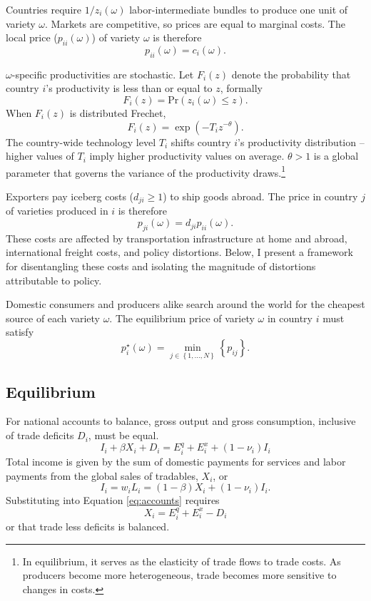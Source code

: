 \documentclass{puthesis}
\begin{document}
Countries require \(1/z_i(\omega)\) labor-intermediate bundles to
produce one unit of variety \(\omega\). Markets are competitive, so
prices are equal to marginal costs. The local price (\(p_{ii}(\omega)\))
of variety \(\omega\) is therefore \begin{equation} \label{eq:pii}
p_{ii}(\omega) = c_i(\omega) .
\end{equation}

\(\omega\)-specific productivities are stochastic. Let \(F_i(z)\) denote
the probability that country \(i\)'s productivity is less than or equal
to \(z\), formally \[
F_i(z) = \text{Pr} \left( z_i(\omega) \leq z \right) .
\] When \(F_i(z)\) is distributed Frechet,
\begin{equation} \label{eq:Frechet}
F_i(z) = \exp \left( - T_i z^{-\theta} \right) .
\end{equation} The country-wide technology level \(T_i\) shifts country
\(i\)'s productivity distribution -- higher values of \(T_i\) imply
higher productivity values on average. \(\theta > 1\) is a global
parameter that governs the variance of the productivity
draws.\footnote{In equilibrium, it serves as the elasticity of trade
  flows to trade costs. As producers become more heterogeneous, trade
  becomes more sensitive to changes in costs.}

Exporters pay iceberg costs (\(d_{ji} \geq 1\)) to ship goods abroad.
The price in country \(j\) of varieties produced in \(i\) is therefore
\[
p_{ji}(\omega) = d_{ji} p_{ii}(\omega) .
\] These costs are affected by transportation infrastructure at home and
abroad, international freight costs, and policy distortions. Below, I
present a framework for disentangling these costs and isolating the
magnitude of distortions attributable to policy.

Domestic consumers and producers alike search around the world for the
cheapest source of each variety \(\omega\). The equilibrium price of
variety \(\omega\) in country \(i\) must satisfy \[
p_i^\star(\omega) = \min_{j \in \left\{ 1,...,N \right\}} \left\{ p_{ij} \right\} .
\]

\subsection{Equilibrium}

For national accounts to balance, gross output and gross consumption,
inclusive of trade deficits \(D_i\), must be equal.
\begin{equation} \label{eq:accounts}
I_i + \beta X_i + D_i = E_i^q + E_i^x + (1 - \nu_i) I_i
\end{equation} Total income is given by the sum of domestic payments for
services and labor payments from the global sales of tradables, \(X_i\),
or \[
I_i = w_i L_i = (1 - \beta) X_i + (1 - \nu_i) I_i .
\] Substituting into Equation \ref{eq:accounts} requires
\begin{equation} \label{eq:tIncome}
X_i = E_i^q + E_i^x - D_i
\end{equation} or that trade less deficits is balanced.
\end{document}
